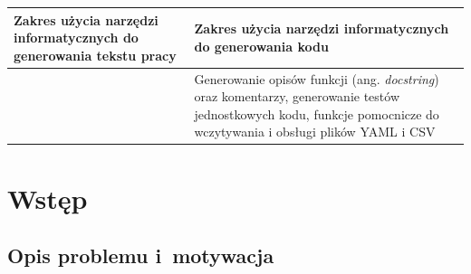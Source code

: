 \documentclass[a4paper,11pt,twoside]{report}
\theoremstyle{definition}
\begin{document}

\begin{table}[h]
\centering
\begin{tabular}{|p{}|p{}|}
\hline
\textbf{Zakres użycia narzędzi informatycznych do generowania tekstu pracy} & \textbf{Zakres użycia narzędzi informatycznych do generowania kodu} \\ \hline
   &  Generowanie opisów funkcji (ang. \emph{docstring}) oraz komentarzy, generowanie testów jednostkowych kodu, funkcje pomocnicze do wczytywania i obsługi plików YAML i CSV  \\ \hline
\end{tabular}
\end{table}





\null\thispagestyle{empty}\newpage
\pagestyle{fancy}
\setcounter{page}{11} %

\chapter{Wstęp}


\section{Opis problemu i~motywacja}
\end{document}
